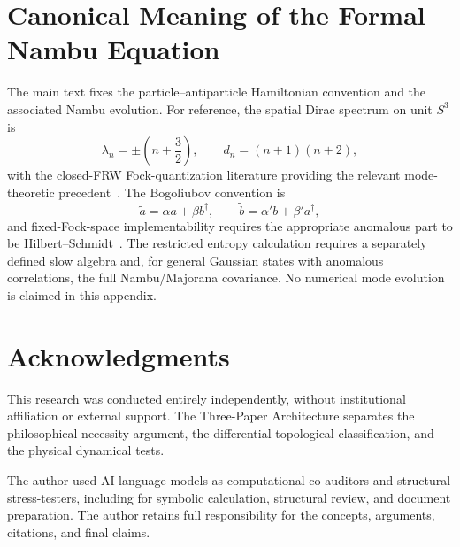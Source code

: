 \documentclass[11pt]{article}
\theoremstyle{canonmath}
\theoremstyle{canonpostulate}
\theoremstyle{canonclaim}
\begin{document}
\section{Canonical Meaning of the Formal Nambu Equation}
\label{app:modes}
The main text fixes the particle--antiparticle Hamiltonian convention and the associated Nambu evolution. For reference, the spatial Dirac spectrum on unit $S^3$ is
\begin{equation}
\lambda_n=\pm\left(n+\frac32\right),\qquad d_n=(n+1)(n+2),
\end{equation}
with the closed-FRW Fock-quantization literature providing the relevant mode-theoretic precedent~\cite{CortezDiracFRW}. The Bogoliubov convention is
\begin{equation}
\widetilde a=\alpha a+\beta b^\dagger,\qquad\widetilde b=\alpha' b+\beta' a^\dagger,
\end{equation}
and fixed-Fock-space implementability requires the appropriate anomalous part to be Hilbert--Schmidt~\cite{ShaleStinespring}. The restricted entropy calculation requires a separately defined slow algebra and, for general Gaussian states with anomalous correlations, the full Nambu/Majorana covariance. No numerical mode evolution is claimed in this appendix.

\section*{Acknowledgments}

This research was conducted entirely independently, without institutional affiliation or external support. The Three-Paper Architecture separates the philosophical necessity argument, the differential-topological classification, and the physical dynamical tests.

The author used AI language models as computational co-auditors and structural stress-testers, including for symbolic calculation, structural review, and document preparation. The author retains full responsibility for the concepts, arguments, citations, and final claims.
\end{document}
